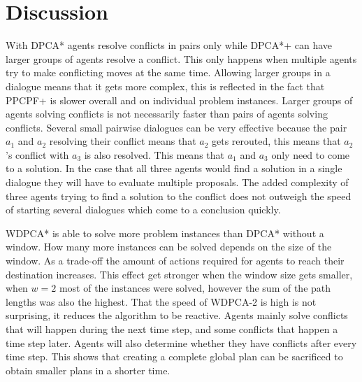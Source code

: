 \section{Discussion}\label{sec:discussion}
With DPCA* agents resolve conflicts in pairs only while DPCA*+ can have larger
groups of agents resolve a conflict. This only happens when multiple agents try
to make conflicting moves at the same time. Allowing larger groups in a
dialogue means that it gets more complex, this is reflected in the fact that
PPCPF+ is slower overall and on individual problem instances. Larger groups of
agents solving conflicts is not necessarily faster than pairs of agents solving
conflicts. Several small pairwise dialogues can be very effective because the
pair $a_1$ and $a_2$ resolving their conflict means that $a_2$ gets rerouted,
this means that $a_2$'s conflict with $a_3$ is also resolved. This means that
$a_1$ and $a_3$ only need to come to a solution. In the case that all three
agents would find a solution in a single dialogue they will have to evaluate
multiple proposals. The added complexity of three agents trying to find a
solution to the conflict does not outweigh the speed of starting several
dialogues which come to a conclusion quickly.

WDPCA* is able to solve more problem instances than DPCA* without a window. How
many more instances can be solved depends on the size of the window. As a
trade-off the amount of actions required for agents to reach their destination
increases. This effect get stronger when the window size gets smaller, when
$w=2$ most of the instances were solved, however the sum of the path lengths
was also the highest. That the speed of WDPCA-2 is high is not surprising, it
reduces the algorithm to be reactive. Agents mainly solve conflicts that will
happen during the next time step, and some conflicts that happen a time step
later. Agents will also determine whether they have conflicts after every time
step. This shows that creating a complete global plan can be sacrificed to
obtain smaller plans in a shorter time.

